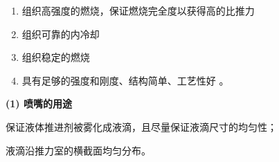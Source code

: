 \blue[设计目标]
\vspace*{-0.5em}
\begin{enumerate}[\hspace*{3em} $\bigstar$]
	\item 组织高强度的燃烧，保证燃烧完全度以获得高的比推力\vspace*{-0.5em}
	\item 组织可靠的内冷却\vspace*{-0.5em}
	\item 组织稳定的燃烧\vspace*{-0.5em}
	\item 具有足够的强度和刚度、结构简单、工艺性好 。
\end{enumerate}
\vspace*{0.5em}

\sssection[喷嘴]

\textbf{(1) \hspace*{0.3em} 喷嘴的用途}

保证液体推进剂被雾化成液滴，且尽量保证液滴尺寸的均匀性；

液滴沿推力室的横截面均匀分布。









